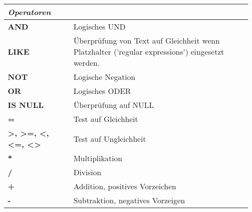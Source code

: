 \begin{center}
	\setlength\arrayrulewidth{1pt}
	\begin{tabular}{|p{} | p{}|}
		\hline
		\rowcolor{tableLightGray} \textit{Operatoren} & \\
		\hline
		\textbf{AND} & Logisches UND\\
		\hline
		\textbf{LIKE} & Überprüfung von Text auf Gleichheit wenn Platzhalter ('regular expressions') eingesetzt werden.\\
		\hline
		\textbf{NOT} & Logische Negation\\
		\hline
		\textbf{OR} & Logisches ODER\\
		\hline
		\textbf{IS NULL} & Überprüfung auf NULL\\
		\hline
		\textbf{=} & Test auf Gleichheit\\
		\hline
		\textbf{>, >=, <, <=, <>} & Test auf Ungleichheit\\
		\hline
		\textbf{*} & Multiplikation\\
		\hline
		\textbf{/} & Division\\
		\hline
		\textbf{+} & Addition, positives Vorzeichen\\
		\hline
		\textbf{-} & Subtraktion, negatives Vorzeigen\\
		\hline
	\end{tabular}
\end{center}